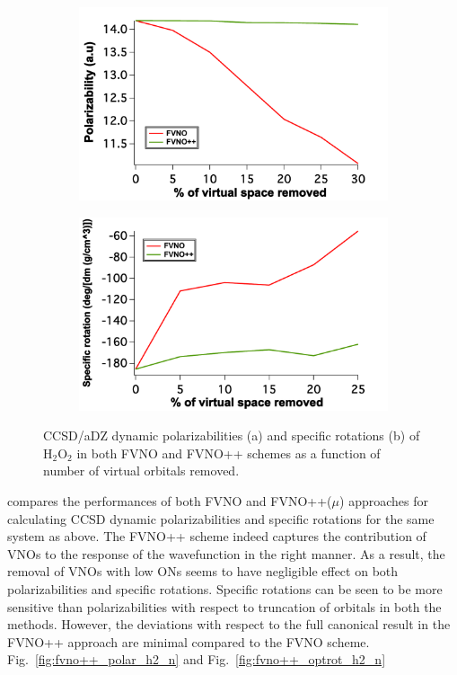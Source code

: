 \begin{figure}
\begin{subfigure}{.5\textwidth}
  \centering
  \includegraphics[width=.9\linewidth]{figures_fvno++/fvno++_h2o2_adz_polar.pdf}
  \caption{}
  \label{fig:sfig1}
\end{subfigure}%
\begin{subfigure}{.5\textwidth}
  \centering
  \includegraphics[width=.9\linewidth]{figures_fvno++/fvno++_h2o2_adz_optrot_lg.pdf}
  \caption{}
  \label{fig:sfig2}
\end{subfigure}
\caption{{\footnotesize CCSD/aDZ dynamic polarizabilities (a) and specific rotations (b) of H$_2$O$_2$ in both FVNO and FVNO++ schemes as a function of
number of virtual orbitals removed.}}
\label{fig:fvno++_h2o2_adz_polar_optrot_lg}
\end{figure}
compares the performances of both FVNO and FVNO++($\mu$) approaches
for calculating CCSD dynamic polarizabilities and specific rotations for the same system as above. The FVNO++ scheme indeed captures the contribution of VNOs to the response of the wavefunction in the right manner. As a result, the removal of VNOs with low ONs seems to have negligible effect on both polarizabilities and specific rotations. Specific rotations can be seen to be more sensitive than polarizabilities with respect to truncation of orbitals in both the methods. However, the deviations with respect to the full canonical result in the FVNO++ approach are minimal compared to the FVNO scheme. Fig.~\ref{fig:fvno++_polar_h2_n} and Fig.~\ref{fig:fvno++_optrot_h2_n} 
